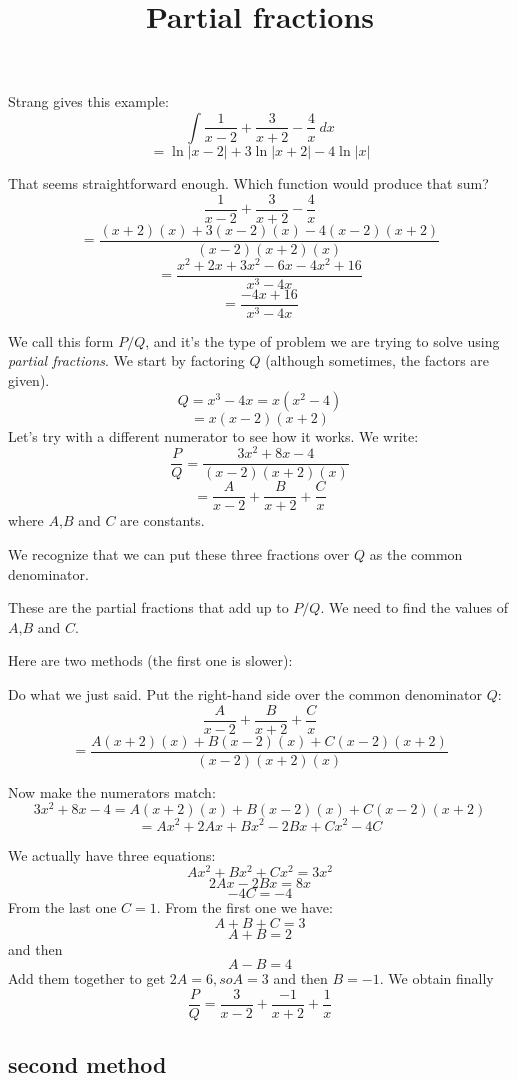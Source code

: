 \documentclass[11pt, oneside]{article}
\title{Partial fractions}
\date{}
\begin{document}
\maketitle
\Large


Strang gives this example:
\[ \int \frac{1}{x-2} + \frac{3}{x+2} - \frac{4}{x} \ dx \]
\[ = \ln |x-2| + 3 \ln |x+2| - 4 \ln |x| \]

That seems straightforward enough.  Which function would produce that sum?
\[ \frac{1}{x-2} + \frac{3}{x+2} - \frac{4}{x}  \]
\[ =\frac{(x+2)(x) + 3(x-2)(x) -4(x-2)(x+2)}{(x-2)(x+2)(x)}  \]
\[ =\frac{x^2 + 2x + 3x^2 - 6x - 4x^2 + 16}{x^3 - 4x}  \]
\[ =\frac{- 4x + 16}{x^3 - 4x}  \]

We call this form $P/Q$, and it's the type of problem we are trying to solve using \emph{partial fractions}.  We start by factoring $Q$ (although sometimes, the factors are given).
\[ Q = x^3 - 4x = x(x^2 -4) \]
\[ = x (x-2) (x+2) \]
Let's try with a different numerator to see how it works.  We write:
\[ \frac{P}{Q} = \frac{3x^2 + 8x -4}{(x-2)(x+2)(x)}  \]
\[ = \frac{A}{x-2} + \frac{B}{x+2} + \frac{C}{x} \]
where $A$,$B$ and $C$ are constants.  

We recognize that we can put these three fractions over $Q$ as the common denominator.

These are the partial fractions that add up to $P/Q$.  We need to find the values of $A$,$B$ and $C$.

Here are two methods (the first one is slower):

Do what we just said.  Put the right-hand side over the common denominator $Q$:
\[ \frac{A}{x-2} + \frac{B}{x+2} + \frac{C}{x} \]
\[ = \frac{A(x+2)(x) + B(x-2)(x) + C(x-2)(x+2)}{(x-2)(x+2)(x)} \]

Now make the numerators match:
\[ 3x^2 + 8x -4 = A(x+2)(x) + B(x-2)(x) + C(x-2)(x+2) \]
\[ = Ax^2 + 2Ax + Bx^2 - 2Bx + Cx^2 - 4C \]

We actually have three equations:
\[ Ax^2 + Bx^2 + Cx^2 = 3x^2 \]
\[ 2Ax - 2Bx = 8x \]
\[ -4C = -4 \]
From the last one $C=1$.  From the first one we have:
\[ A + B + C = 3 \]
\[ A + B = 2 \]
and then
\[ A - B = 4 \]
Add them together to get $2A = 6, so A = 3$ and then $B = -1$.
We obtain finally
\[ \frac{P}{Q} = \frac{3}{x-2} + \frac{-1}{x+2} + \frac{1}{x} \]

\subsection*{second method}
\end{document}
